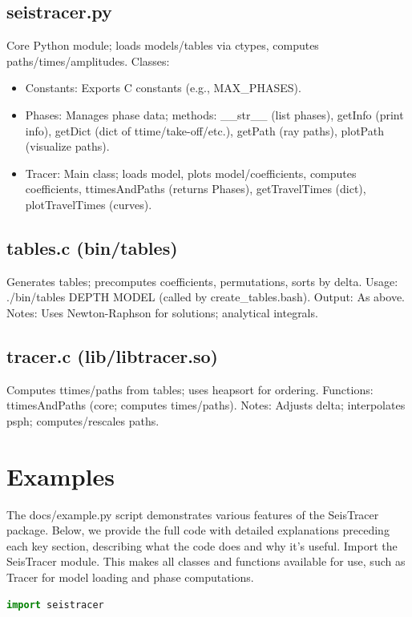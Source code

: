 \documentclass[12pt,a4paper]{article}
\begin{document}
\subsection{seistracer.py}
Core Python module; loads models/tables via ctypes, computes paths/times/amplitudes.
Classes:

\begin{itemize}
    \item Constants: Exports C constants (e.g., MAX\_PHASES).
    \item Phases: Manages phase data; methods: \_\_str\_\_ (list phases), getInfo (print info), getDict (dict of ttime/take-off/etc.), getPath (ray paths), plotPath (visualize paths).
    \item Tracer: Main class; loads model, plots model/coefficients, computes coefficients, ttimesAndPaths (returns Phases), getTravelTimes (dict), plotTravelTimes (curves).
\end{itemize}

\subsection{tables.c (bin/tables)}
Generates tables; precomputes coefficients, permutations, sorts by delta.
Usage: ./bin/tables DEPTH MODEL (called by create\_tables.bash).
Output: As above.
Notes: Uses Newton-Raphson for solutions; analytical integrals.

\subsection{tracer.c (lib/libtracer.so)}
Computes ttimes/paths from tables; uses heapsort for ordering.
Functions: ttimesAndPaths (core; computes times/paths).
Notes: Adjusts delta; interpolates psph; computes/rescales paths.

\section{Examples}
The docs/example.py script demonstrates various features of the SeisTracer package. Below, we provide the full code with detailed explanations preceding each key section, describing what the code does and why it's useful.
Import the SeisTracer module. This makes all classes and functions available for use, such as Tracer for model loading and phase computations.

\begin{lstlisting}[language=Python]
import seistracer
\end{lstlisting}
\end{document}
